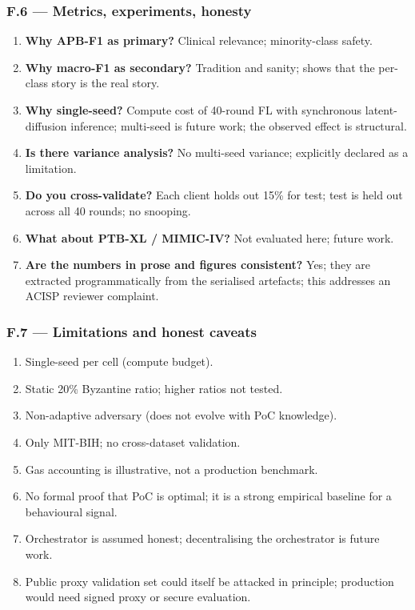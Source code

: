 \documentclass[11pt,a4paper]{article}
\begin{document}
\subsubsection{F.6 --- Metrics, experiments, honesty}
\begin{enumerate}
\item \textbf{Why APB-F1 as primary?} Clinical relevance; minority-class safety.
\item \textbf{Why macro-F1 as secondary?} Tradition and sanity; shows that the per-class story is the real story.
\item \textbf{Why single-seed?} Compute cost of 40-round FL with synchronous latent-diffusion inference; multi-seed is future work; the observed effect is structural.
\item \textbf{Is there variance analysis?} No multi-seed variance; explicitly declared as a limitation.
\item \textbf{Do you cross-validate?} Each client holds out 15\% for test; test is held out across all 40 rounds; no snooping.
\item \textbf{What about PTB-XL / MIMIC-IV?} Not evaluated here; future work.
\item \textbf{Are the numbers in prose and figures consistent?} Yes; they are extracted programmatically from the serialised artefacts; this addresses an ACISP reviewer complaint.
\end{enumerate}

\subsubsection{F.7 --- Limitations and honest caveats}
\begin{enumerate}
\item Single-seed per cell (compute budget).
\item Static 20\% Byzantine ratio; higher ratios not tested.
\item Non-adaptive adversary (does not evolve with PoC knowledge).
\item Only MIT-BIH; no cross-dataset validation.
\item Gas accounting is illustrative, not a production benchmark.
\item No formal proof that PoC is optimal; it is a strong empirical baseline for a behavioural signal.
\item Orchestrator is assumed honest; decentralising the orchestrator is future work.
\item Public proxy validation set could itself be attacked in principle; production would need signed proxy or secure evaluation.
\end{enumerate}
\end{document}
